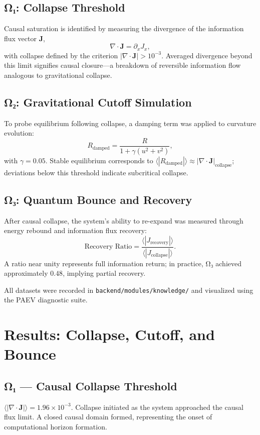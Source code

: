 \documentclass[11pt,a4paper]{article}
\begin{document}
\subsection*{Ω₁: Collapse Threshold}
Causal saturation is identified by measuring the divergence of the information flux vector \(\mathbf{J}\),
\[
\nabla \cdot \mathbf{J} = \partial_x J_x,
\]
with collapse defined by the criterion \(|\nabla\cdot\mathbf{J}| > 10^{-3}\).  
Averaged divergence beyond this limit signifies causal closure—a breakdown of reversible information flow analogous to gravitational collapse.

\subsection*{Ω₂: Gravitational Cutoff Simulation}
To probe equilibrium following collapse, a damping term was applied to curvature evolution:
\[
R_{\text{damped}} = \frac{R}{1 + \gamma (u^2 + v^2)},
\]
with \(\gamma=0.05\).  
Stable equilibrium corresponds to \(\langle |R_{\text{damped}}| \rangle \approx |\nabla\cdot\mathbf{J}|_{\text{collapse}}\); deviations below this threshold indicate subcritical collapse.

\subsection*{Ω₃: Quantum Bounce and Recovery}
After causal collapse, the system’s ability to re-expand was measured through energy rebound and information flux recovery:
\[
\text{Recovery Ratio} = \frac{\langle |J_{\text{recovery}}| \rangle}{\langle |J_{\text{collapse}}| \rangle}.
\]
A ratio near unity represents full information return; in practice, Ω₃ achieved approximately \(0.48\), implying partial recovery.

All datasets were recorded in \texttt{backend/modules/knowledge/} and visualized using the PAEV diagnostic suite.

\section{Results: Collapse, Cutoff, and Bounce}
\subsection*{Ω₁ — Causal Collapse Threshold}
\(\langle |\nabla\cdot\mathbf{J}| \rangle = 1.96\times10^{-3}\).
Collapse initiated as the system approached the causal flux limit.  
A closed causal domain formed, representing the onset of computational horizon formation.
\end{document}
